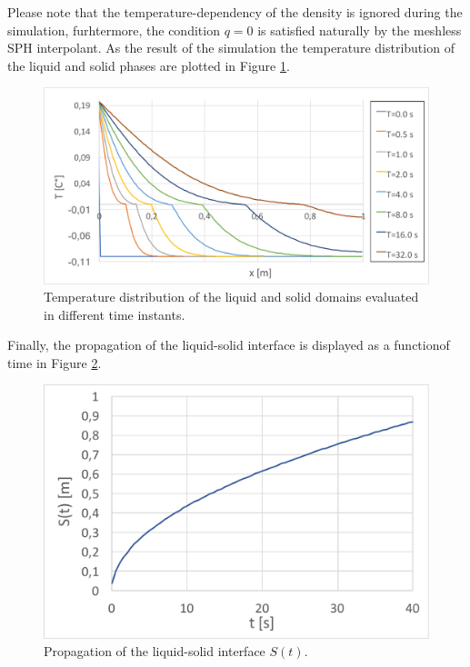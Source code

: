 \documentclass[a4paper,12pt,openany]{book}
\theoremstyle{break}
\begin{document}
Please note that the temperature-dependency of the density is ignored during the simulation, furhtermore, the condition $q=0$ is satisfied naturally by the meshless SPH interpolant. As the result of the simulation the temperature distribution of the liquid and solid phases are plotted in Figure \ref{fig:stefan_problem_result}.
\begin{figure}[H]
  \includegraphics[scale=0.5]{stefan_problem_result.pdf}
  \centering
  \caption{Temperature distribution of the liquid and solid domains evaluated in different time instants.}
  \label{fig:stefan_problem_result}
\end{figure}\vspace*{3pt}

Finally, the propagation of the liquid-solid interface is displayed as a functionof time in Figure \ref{fig:stefan_problem_result_s}.
\begin{figure}[H]
  \includegraphics[scale=0.5]{stefan_problem_result_s.pdf}
  \centering
  \caption{Propagation of the liquid-solid interface $S(t)$.}
  \label{fig:stefan_problem_result_s}
\end{figure}\vspace*{3pt}
\end{document}
